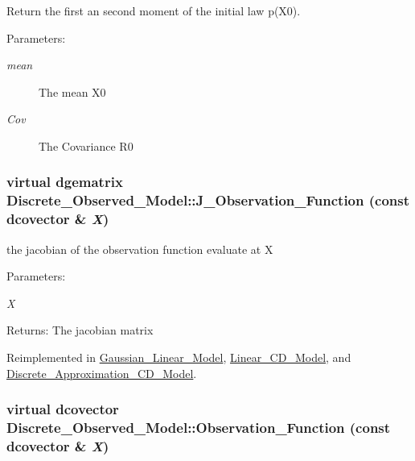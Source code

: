 Return the first an second moment of the initial law p(X0). 

\begin{Desc}
\item[Parameters:]
\begin{description}
\item[{\em mean}]The mean X0 \item[{\em Cov}]The Covariance R0 \end{description}
\end{Desc}
\hypertarget{class_discrete___observed___model_83cd1f2f54544d8977dbce844031f85e}{
\subsubsection[{J\_\-Observation\_\-Function}]{\setlength{\rightskip}{0pt plus 5cm}virtual dgematrix Discrete\_\-Observed\_\-Model::J\_\-Observation\_\-Function (const dcovector \& {\em X})}}
\label{class_discrete___observed___model_83cd1f2f54544d8977dbce844031f85e}


the jacobian of the observation function evaluate at X 

\begin{Desc}
\item[Parameters:]
\begin{description}
\item[{\em X}]\end{description}
\end{Desc}
\begin{Desc}
\item[Returns:]The jacobian matrix \end{Desc}


Reimplemented in \hyperlink{class_gaussian___linear___model_ea76d88935c900fdc3e39775380446dc}{Gaussian\_\-Linear\_\-Model}, \hyperlink{class_linear___c_d___model_6188317af5df5b7d495f84256bb1c75a}{Linear\_\-CD\_\-Model}, and \hyperlink{class_discrete___approximation___c_d___model_be25ebdd3667dff8f8f43b72dc4e59ef}{Discrete\_\-Approximation\_\-CD\_\-Model}.\hypertarget{class_discrete___observed___model_8d56d86ea6b204672c8ebd720f1e11a6}{
\subsubsection[{Observation\_\-Function}]{\setlength{\rightskip}{0pt plus 5cm}virtual dcovector Discrete\_\-Observed\_\-Model::Observation\_\-Function (const dcovector \& {\em X})}}
\label{class_discrete___observed___model_8d56d86ea6b204672c8ebd720f1e11a6}


